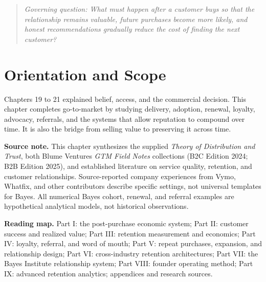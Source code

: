 
\begin{quote}
\textit{Governing question: What must happen after a customer buys so that the relationship remains valuable, future purchases become more likely, and honest recommendations gradually reduce the cost of finding the next customer?}
\end{quote}

\vspace{1.5pt}

\section*{Orientation and Scope}

Chapters 19 to 21 explained belief, access, and the commercial decision. This chapter completes go-to-market by studying delivery, adoption, renewal, loyalty, advocacy, referrals, and the systems that allow reputation to compound over time. It is also the bridge from selling value to preserving it across time.

\textbf{Source note.} This chapter synthesizes the supplied \textit{Theory of Distribution and Trust}, both Blume Ventures \textit{GTM Field Notes} collections (B2C Edition 2024; B2B Edition 2025), and established literature on service quality, retention, and customer relationships. Source-reported company experiences from Vymo, Whatfix, and other contributors describe specific settings, not universal templates for Bayes. All numerical Bayes cohort, renewal, and referral examples are hypothetical analytical models, not historical observations.

\textbf{Reading map.} Part I: the post-purchase economic system; Part II: customer success and realized value; Part III: retention measurement and economics; Part IV: loyalty, referral, and word of mouth; Part V: repeat purchases, expansion, and relationship design; Part VI: cross-industry retention architectures; Part VII: the Bayes Institute relationship system; Part VIII: founder operating method; Part IX: advanced retention analytics; appendices and research sources.

